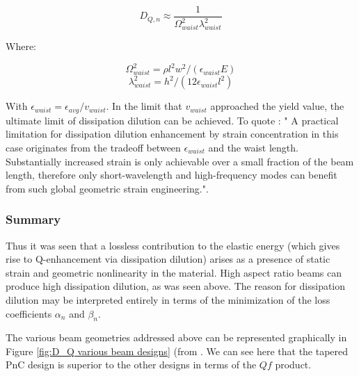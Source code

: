 \documentclass[%
 reprint,
nofootinbib,
 amsmath,amssymb,
 aps,
]{revtex4-2}
\begin{document}
\begin{equation*}
    D_{Q,n} \approx \frac{1}{\Omega_{waist}^2 \lambda_{waist}^2 }
\end{equation*}

Where:

\begin{equation*}
    \Omega_{waist}^2 = \rho l^2 w^2 / (\epsilon_{waist} E)
\end{equation*}
\begin{equation*}
    \lambda_{waist}^2 = h^2 / (12 \epsilon_{waist} l^2)
\end{equation*}

With $\epsilon_{waist} = \epsilon_{avg} / v_{waist}$. In the limit that $v_{waist}$ approached the yield value, the ultimate limit of dissipation dilution can be achieved. To quote \cite{generalized_dissipation_dilution}: " A practical limitation for dissipation dilution enhancement by strain concentration in this case originates from the tradeoff between $\epsilon_{waist}$ and the waist length. Substantially increased strain is only achievable over a small fraction of the beam length, therefore only short-wavelength and high-frequency modes can benefit from such global geometric strain engineering.".


\subsubsection{Summary}
Thus it was seen that a lossless contribution to the elastic energy (which gives rise to Q-enhancement via dissipation dilution) arises as a presence of static strain and geometric nonlinearity in the material. High aspect ratio beams can produce high dissipation dilution, as was seen above. The reason for dissipation dilution may be interpreted entirely in terms of the minimization of the loss coefficients $\alpha_n$ and $\beta_n$.
\newline


The various beam geometries addressed above can be represented graphically in Figure \ref{fig:D_Q various beam designs} (from \cite{generalized_dissipation_dilution}. We can see here that the tapered PnC design is superior to the other designs in terms of the $Qf$ product.
\end{document}
